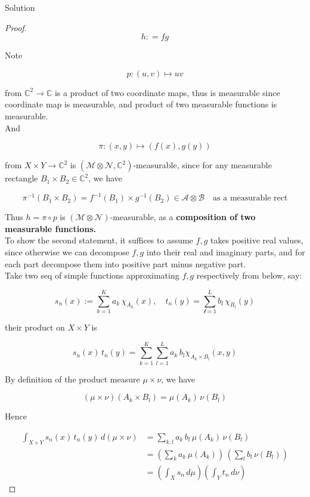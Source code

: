 \begin{qlsolution}{Solution}
\begin{proof}
\[h: = fg\]

Note

\[p:(u,v)\mapsto uv\]

from \(\mathbb{C}^{2}\rightarrow\mathbb{C}\) is a product of two coordinate maps, thus is measurable since coordinate map is measurable, and product of two measurable functions is measurable.\\
And

\[\pi:(x,y)\mapsto(f(x),g(y))\]

from \(X \times Y\rightarrow\mathbb{C}^{2}\) is \((\mathcal{M} \otimes \mathcal{N},\mathbb{C}^{2})\)-measurable, since for any measurable rectangle \(B_{1} \times B_{2} \in \mathbb{C}^{2}\), we have

\[\pi^{- 1}(B_{1} \times B_{2}) = f^{- 1}(B_{1}) \times g^{- 1}(B_{2}) \in \mathcal{A} \otimes \mathcal{B}\quad\text{as a measurable rect}\]

Thus \(h = \pi \circ p\) is \((\mathcal{M} \otimes \mathcal{N})\)-measurable, as a \textbf{composition of two measurable functions.}\\
To show the second statement, it suffices to assume \(f,g\) takes positive real values, since otherwise we can decompose \(f,g\) into their real and imaginary parts, and for each part decompose them into positive part minus negative part.\\
Take two seq of simple functions approximating \(f,g\) respectively from below, say:

\[s_{n}(x) := \sum\limits_{k = 1}^{K}a_{k}\,\chi_{A_{k}}(x),\quad t_{n}(y) = \sum\limits_{\mathcal{l} = 1}^{L}b_{l}\,\chi_{B_{l}}(y)\]

their product on \(X \times Y\) is

\[s_{n}(x)\, t_{n}(y) = \sum\limits_{k = 1}^{K}\sum\limits_{l = 1}^{L}a_{k}\, b_{l}\chi_{A_{k} \times B_{l}}(x,y)\]

By definition of the product measure \(\mu \times \nu\), we have

\[(\mu \times \nu)(A_{k} \times B_{l}) = \mu(A_{k})\,\nu(B_{l})\]

Hence

\[\begin{matrix}
{\int_{X \times Y}s_{n}(x)\, t_{n}(y)\, d(\mu \times \nu)} & {= \sum\limits_{k,l}a_{k}\, b_{l}\,\mu(A_{k})\,\nu(B_{l})} \\
 & {= (\sum\limits_{k}a_{k}\,\mu(A_{k}))\,(\sum\limits_{l}b_{l}\,\nu(B_{l}))} \\
 & {= (\int_{X}s_{n}\, d\mu)(\int_{Y}t_{n}\, d\nu)}
\end{matrix}\]


\end{proof}
\end{qlsolution}
